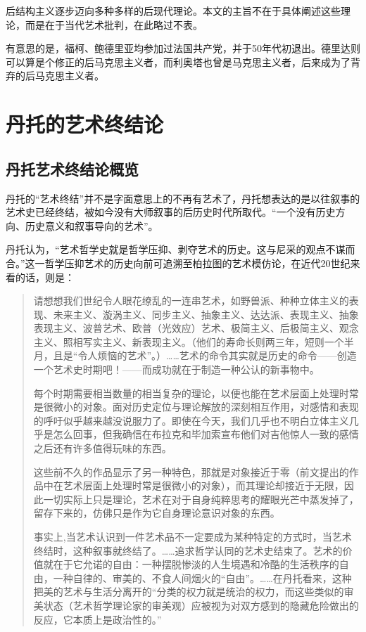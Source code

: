 后结构主义逐步迈向多种多样的后现代理论。本文的主旨不在于具体阐述这些理论，而是在于当代艺术批判，在此略过不表。

有意思的是，福柯、鲍德里亚均参加过法国共产党，并于50年代初退出。德里达则可以算是个修正的后马克思主义者，而利奥塔也曾是马克思主义者，后来成为了背弃的后马克思主义者。

\section{丹托的艺术终结论}

\subsection{丹托艺术终结论概览}丹托的“艺术终结”并不是字面意思上的不再有艺术了，丹托想表达的是以往叙事的艺术史已经终结，被如今没有大师叙事的后历史时代所取代。“一个没有历史方向、历史意义和叙事导向的艺术”。

丹托认为，“艺术哲学史就是哲学压抑、剥夺艺术的历史。这与尼采的观点不谋而合。”\cite{dantuozhenduan}这一哲学压抑艺术的历史向前可追溯至柏拉图的艺术模仿论，在近代20世纪来看的话，则是：

\begin{quotation}

  请想想我们世纪令人眼花缭乱的一连串艺术，如野兽派、种种立体主义的表现、未来主义、漩涡主义、同步主义、抽象主义、达达派、表现主义、抽象表现主义、波普艺术、欧普（光效应）艺术、极简主义、后极简主义、观念主义、照相写实主义、新表现主义。（他们的寿命长则两三年，短则一个半月，且是“令人烦恼的艺术”。）……艺术的命令其实就是历史的命令——创造一个艺术史时期吧！——而成功就在于制造一种公认的新事物中。

  每个时期需要相当数量的相当复杂的理论，以便也能在艺术层面上处理时常是很微小的对象。面对历史定位与理论解放的深刻相互作用，对感情和表现的呼吁似乎越来越没说服力了。即使在今天，我们几乎也不明白立体主义几乎是怎么回事，但我确信在布拉克和毕加索宣布他们对吉他惊人一致的感情之后还有许多值得玩味的东西。

  这些前不久的作品显示了另一种特色，那就是对象接近于零（前文提出的作品中在艺术层面上处理时常是很微小的对象），而其理论却接近于无限，因此一切实际上只是理论，艺术在对于自身纯粹思考的耀眼光芒中蒸发掉了，留存下来的，仿佛只是作为它自身理论意识对象的东西。

  事实上,当艺术认识到一件艺术品不一定要成为某种特定的方式时，当艺术终结时，这种叙事就终结了。……追求哲学认同的艺术史结束了。艺术的价值就在于它允诺的自由：一种摆脱惨淡的人生境遇和冷酷的生活秩序的自由，一种自律的、审美的、不食人间烟火的“自由”。……在丹托看来，这种把美的艺术与生活分离开的“分类的权力就是统治的权力，而这些类似的审美状态（艺术哲学理论家的审美观）应被视为对双方感到的隐藏危险做出的反应，它本质上是政治性的。”\cite{dantuozhenduan}

\end{quotation}

